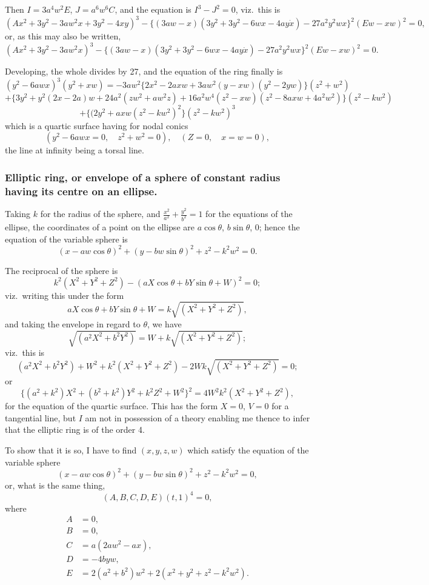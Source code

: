 \documentclass[11pt,a4paper]{book}
\begin{document}
Then $I = 3a^4w^2 E$, $J = a^6w^6 C$, and the equation is $I^3 - J^2 = 0$, viz.\ this is
\[
(Ax^2 + 3y^2 - 3aw^2x + 3y^2 - 4xy)^3 - \{(3aw - x)(3y^2 + 3y^2 - 6w x - 4ay\dot{x}) - 27a^2 y^2 w x\}^2 (Ew - x w)^2 = 0,
\]
or, as this may also be written,
\[
(Ax^2 + 3y^2 - 3aw^2 x)^3 - \{(3aw - x)(3y^2 + 3y^2 - 6w x - 4ay\dot{x}) - 27a^2 y^2 w x\}^2 (Ew - x w)^2 = 0.
\]

Developing, the whole divides by 27, and the equation of the ring finally is
\[
(y^2 - 6awx)^3 (y^2 + x w) = -3a w^2 \{2x^2 - 2axw + 3a w^2 (y - x w) (y^2 - 2y w) \} (z^2 + w^2)
\]
\[
+ \{3y^2 + y^2 (2x - 2a) w + 24a^2 (z w^2 + a w^2 z) + 16a^2 w^4 (z^2 - x w) (z^2 - 8a x w + 4a^2 w^2) \} (z^2 - kw^2)
\]
\[
+ \{(2y^2 + a x w (z^2 - kw^2)^2 \}(z^2 - k w^2)^3
\]
which is a quartic surface having for nodal conics
\[
(y^2 - 6awx = 0, \quad z^2 + w^2 = 0), \quad (Z = 0, \quad x = w = 0),
\]
the line at infinity being a torsal line.

\subsubsection*{Elliptic ring, or envelope of a sphere of constant radius having its centre on an ellipse.}

Taking $k$ for the radius of the sphere, and $\frac{x^2}{a^2} + \frac{y^2}{b^2} = 1$ for the equations of
the ellipse, the coordinates of a point on the ellipse are $a\cos\theta$, $b\sin\theta$, $0$; hence the
equation of the variable sphere is
\[
(x - aw\cos\theta)^2 + (y - bw\sin\theta)^2 + z^2 - k^2 w^2 = 0.
\]

The reciprocal of the sphere is
\[
k^2 (X^2 + Y^2 + Z^2) - (aX\cos\theta + bY\sin\theta + W)^2 = 0;
\]
viz.\ writing this under the form
\[
aX\cos\theta + bY\sin\theta + W = k\sqrt{(X^2 + Y^2 + Z^2)},
\]
and taking the envelope in regard to $\theta$, we have
\[
\sqrt{(a^2X^2 + b^2Y^2)} = W + k\sqrt{(X^2 + Y^2 + Z^2)};
\]
viz.\ this is
\[
(a^2X^2 + b^2Y^2) + W^2 + k^2(X^2 + Y^2 + Z^2) - 2W k \sqrt{(X^2 + Y^2 + Z^2)} = 0;
\]
or
\[
\{(a^2 + k^2)X^2 + (b^2 + k^2)Y^2 + k^2 Z^2 + W^2\}^2 = 4W^2 k^2 (X^2 + Y^2 + Z^2),
\]
for the equation of the quartic surface.  This has the form $X = 0$, $V = 0$ for a tangential
line, but $I$ am not in possession of a theory enabling me thence to infer that the
elliptic ring is of the order 4.

To show that it is so, I have to find $(x, y, z, w)$ which satisfy the equation
of the variable sphere
\[
(x - aw\cos\theta)^2 + (y - bw\sin\theta)^2 + z^2 - k^2 w^2 = 0,
\]
or, what is the same thing,
\[
(A, B, C, D, E)(t, 1)^4 = 0,
\]
where
\begin{align*}
A &= 0, \\
B &= 0, \\
C &= a(2aw^2 - ax), \\
D &= -4 byw, \\
E &= 2(a^2 + b^2)w^2 + 2(x^2 + y^2 + z^2 - k^2 w^2).
\end{align*}
\end{document}
